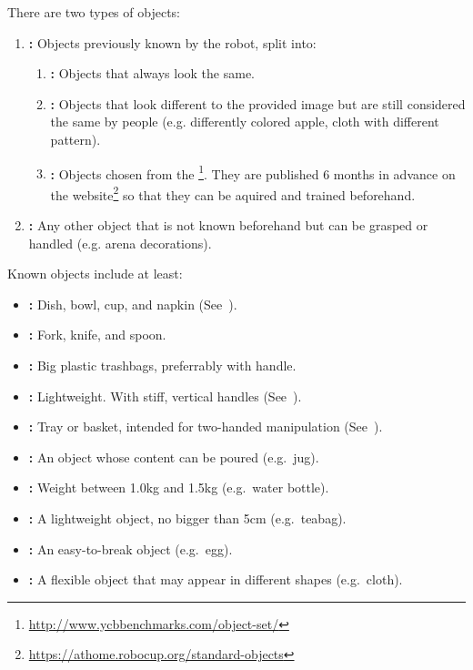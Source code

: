 There are two types of objects:

\begin{enumerate}
	\item \textbf{\KnownObjects{}:} Objects previously known by the robot, split into:
	\begin{enumerate}
		\item \textbf{\RegularObjects{}:} Objects that always look the same.
		\item \textbf{\AlikeObjects{}:} Objects that look different to the provided image but are still considered the same by people (e.g. differently colored apple, cloth with different pattern).
		\item \textbf{\StandardObjects{}:} Objects chosen from the \YCBData{}\footnote{\url{http://www.ycbbenchmarks.com/object-set/}}. They are published 6 months in advance on the \RoboCup\AtHome{} website\footnote{\url{https://athome.robocup.org/standard-objects}} so that they can be aquired and trained beforehand.
	\end{enumerate}

	\item \textbf{\UnknownObjects{}:} Any other object that is not known beforehand but can be grasped or handled (e.g. arena decorations).
\end{enumerate}

Known objects include at least:
\begin{itemize}
	\item \textbf{:} Dish, bowl, cup, and napkin (See~).
	\item \textbf{:} Fork, knife, and spoon.
	\item \textbf{:} Big plastic trashbags, preferrably with handle.
	\item \textbf{:} Lightweight. With stiff, vertical handles (See~).
	\item \textbf{:} Tray or basket, intended for two-handed manipulation (See~).
	\item \textbf{:} An object whose content can be poured (e.g.~jug).
	\item \textbf{:} Weight between 1.0kg and 1.5kg (e.g.~water bottle).
	\item \textbf{:} A lightweight object, no bigger than 5cm (e.g.~teabag).
	\item \textbf{:} An easy-to-break object (e.g.~egg).
	\item \textbf{:} A flexible object that may appear in different shapes (e.g.~cloth).
\end{itemize}

